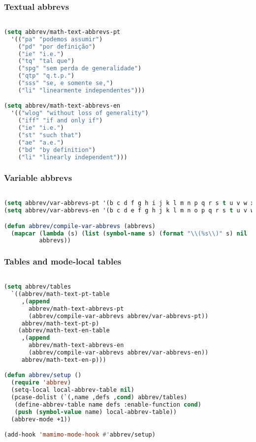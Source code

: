 \documentclass[11pt]{article}
\begin{document}
\subsubsection{Textual abbrevs}
\label{sec:textual-abbrevs}
\begin{lstlisting}[language=Lisp]%! Someone please complete this list for me

(setq abbrev/math-text-abbrevs-pt
  '(("pa" "podemos assumir")
    ("pd" "por definição")
    ("ie" "i.e.")
    ("tq" "tal que")
    ("spg" "sem perda de generalidade")
    ("qtp" "q.t.p.")
    ("sss" "se, e somente se,")
    ("li" "linearmente independentes")))

(setq abbrev/math-text-abbrevs-en
  '(("wlog" "without loss of generality")
    ("iff" "if and only if")
    ("ie" "i.e.")
    ("st" "such that")
    ("ae" "a.e.")
    ("bd" "by definition")
    ("li" "linearly independent")))
\end{lstlisting}

\subsubsection{Variable abbrevs}
\label{sec:variable-abbrevs}
\begin{lstlisting}[language=Lisp]%! Someone please complete this list for me

(setq abbrev/var-abbrevs-pt '(b c d f g h i j k l m n p q r s t u v w x y z))
(setq abbrev/var-abbrevs-en '(b c d e f g h j k l m n o p q r s t u v w x y z))

(defun abbrev/compile-var-abbrevs (abbrevs)
  (mapcar (lambda (s) (list (symbol-name s) (format "\\(%s\\)" s) nil :system t))
          abbrevs))
\end{lstlisting}

\subsubsection{Tables and mode-local tables}
\label{sec:tables-and-mode-local-tables}
\begin{lstlisting}[language=Lisp]%! Someone please complete this list for me

(setq abbrev/tables
  `((abbrev/math-text-pt-table
     ,(append
       abbrev/math-text-abbrevs-pt
       (abbrev/compile-var-abbrevs abbrev/var-abbrevs-pt))
     abbrev/math-text-pt-p)
    (abbrev/math-text-en-table
     ,(append
       abbrev/math-text-abbrevs-en
       (abbrev/compile-var-abbrevs abbrev/var-abbrevs-en))
     abbrev/math-text-en-p)))

(defun abbrev/setup ()
  (require 'abbrev)
  (setq-local local-abbrev-table nil)
  (pcase-dolist (`(,name ,defs ,cond) abbrev/tables)
   (define-abbrev-table name defs :enable-function cond)
   (push (symbol-value name) local-abbrev-table))
  (abbrev-mode +1))

(add-hook 'mamimo-mode-hook #'abbrev/setup)
\end{lstlisting}
\end{document}

